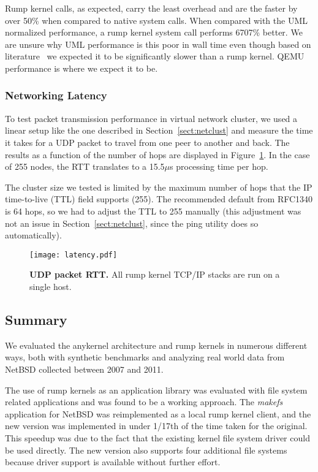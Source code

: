Rump kernel calls, as expected, carry the least overhead and are
the faster by over 50\% when compared to native system calls.  When
compared with the UML normalized performance, a rump kernel system
call performs 6707\% better.  We are unsure why UML performance is
this poor in wall time even though based on
literature~\cite{barham:xen,leslie:wombat} we expected it to be
significantly slower than a rump kernel.  QEMU performance is where
we expect it to be.

\subsubsection{Networking Latency}

To test packet transmission performance in virtual network cluster,
we used a linear setup like the one described in
Section~\ref{sect:netclust} and measure the time it takes for a
UDP packet to travel from one peer to another and back.  The results
as a function of the number of hops are displayed in Figure~\ref{fig:cluster}.
In the case of 255 nodes, the RTT translates to a 15.5$\mu$s
processing time per hop.

The cluster size we tested is limited by the maximum number of hops
that the IP time-to-live (TTL) field supports (255).  The recommended
default from RFC1340 is 64 hops, so we had to adjust the TTL to
255 manually (this adjustment was not an issue in Section~\ref{sect:netclust}, since
the ping utility does so automatically).

\begin{figure}[t]
\texttt{[image: latency.pdf]}
\caption[UDP packet RTT]{
\textbf{UDP packet RTT.}
All rump kernel TCP/IP stacks are run on a single host.
}
\label{fig:cluster}
\end{figure}

\subsection{Summary}

We evaluated the anykernel architecture and rump kernels in numerous
different ways, both with synthetic benchmarks and analyzing real
world data from NetBSD collected between 2007 and 2011.

The use of rump kernels as an application library was evaluated
with file system related applications and was found to be a working
approach.  The \textit{makefs} application for NetBSD was reimplemented
as a local rump kernel client, and the new version was implemented
in under 1/17th of the time taken for the original.  This speedup
was due to the fact that the existing kernel file system driver
could be used directly.  The new version also supports four additional
file systems because driver support is available without further effort.


